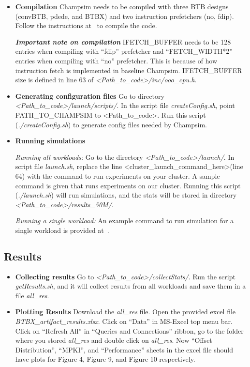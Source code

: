 \begin{itemize}
\item \textbf{Compilation} Champsim needs to be compiled with three BTB designs (convBTB, pdede, and BTBX) and two instruction prefetchers (no, fdip). Follow the instructions at~\cite{btbx-artifacts} to compile the code.


\textbf{\textit{Important note on compilation}} IFETCH\_BUFFER needs to be 128 entries when compiling with “fdip” prefetcher and “FETCH\_WIDTH*2” entries when compiling with “no” prefetcher. This is because of how instruction fetch is implemented in baseline Champsim. IFETCH\_BUFFER size is defined in line 63 of \emph{\textless Path\_to\_code\textgreater/inc/ooo\_cpu.h}. 

\item \textbf{Generating configuration files} 
Go to directory \emph{\textless Path\_to\_code\textgreater/launch/scripts/}. In the script file \emph{createConfig.sh}, point PATH\_TO\_CHAMPSIM to \textless Path\_to\_code\textgreater. Run this script (\emph{./createConfig.sh}) to generate config files needed by Champsim.

\item \textbf{Running simulations}

\noindent \textit{Running all workloads:} Go to the directory \emph{\textless Path\_to\_code\textgreater/launch/}. In script file \emph{launch.sh}, replace the line \textless cluster\_launch\_command\_here\textgreater (line 64) with the command to run experiments on your cluster. A sample command is given that runs experiments on our cluster. Running this script (\emph{./launch.sh}) will run simulations, and the stats will be stored in directory \emph{\textless Path\_to\_code\textgreater/results\_50M/}.

\noindent \textit{Running a single workload:} An example command to run simulation for a single workload is provided at~\cite{btbx-artifacts}.

\end{itemize}

\subsection{Results}
\begin{itemize}
\item \textbf{Collecting results}
Go to \emph{\textless Path\_to\_code\textgreater/collectStats/}. Run the script \emph{getResults.sh}, and it will collect results from all workloads and save them in a file \emph{all\_res}.

\item \textbf{Plotting Results}
Download the \emph{all\_res} file. Open the provided excel file \emph{BTBX\_artifact\_results.xlsx}. Click on “Data” in MS-Excel top menu bar. Click on “Refresh All” in “Queries and Connections” ribbon, go to the folder where you stored \emph{all\_res} and double click on \emph{all\_res}. Now “Offset Distribution”, “MPKI”, and “Performance” sheets in the excel file should have plots for Figure 4, Figure 9, and Figure 10 respectively. 
\end{itemize}